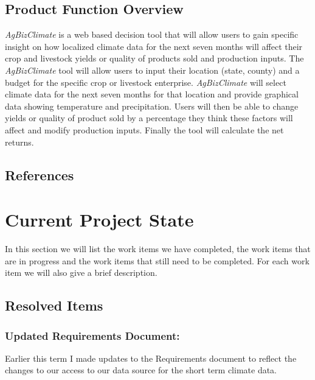 \documentclass[onecolumn, draftclsnofoot,10pt, compsoc]{article}
\begin{document}
		\subsection{Product Function Overview}
		    \textit{AgBizClimate} is a web based decision tool that will allow users to gain specific insight on how localized climate data for the next seven months will affect their crop and livestock yields or quality of products sold and production inputs. The \textit{AgBizClimate} tool will allow users to input their location (state, county) and a budget for the specific crop or livestock enterprise. \textit{AgBizClimate} will select climate data for the next seven months for that location and provide graphical data showing temperature and precipitation. Users will then be able to change yields or quality of product sold by a percentage they think these factors will affect and modify production inputs. Finally the tool will calculate the net returns.\\



		\renewcommand\refname{\vskip -1cm}
		\subsection{References}

		    \nocite{*}
            
            


\section{Current Project State}
In this section we will list the work items we have completed, the work items that are in progress and the work items that still need to be completed. For each work item we will also give a brief description.\\

	\subsection{Resolved Items}
		\subsubsection{Updated Requirements Document:}
		Earlier this term I made updates to the Requirements document to reflect the changes to our access to our data source for the short term climate data.\\
		
\end{document}
